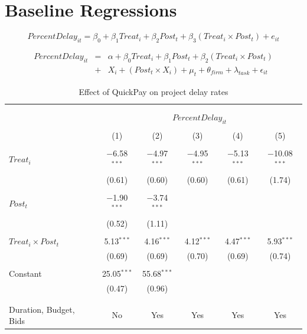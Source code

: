 \documentclass[
]{article}
\begin{document}
\hypertarget{baseline-regressions}{%
\section{Baseline Regressions}\label{baseline-regressions}}

\[ PercentDelay_{it} = \beta_0 + \beta_1 Treat_i + \beta_2 Post_t + \beta_3 (Treat_i \times Post_t) + e_{it}\]

\[ \begin{aligned} PercentDelay_{it} &=& \alpha+\beta_0 Treat_i + \beta_1 Post_t + \beta_2 (Treat_i \times Post_t)\\
&+&  X_i + (Post_t \times X_i) + \mu_t + \theta_{firm} + \lambda_{task}+ \epsilon_{it}
\end{aligned}\]

\begin{table}[H] \centering 
  \caption{Effect of QuickPay on project delay rates} 
  \label{} 
\small 
\begin{tabular}{@{\extracolsep{-2pt}}lccccc} 
\\[-1.8ex]\hline 
\hline \\[-1.8ex] 
\\[-1.8ex] & \multicolumn{5}{c}{$PercentDelay_{it}$} \\ 
\\[-1.8ex] & (1) & (2) & (3) & (4) & (5)\\ 
\hline \\[-1.8ex] 
 $Treat_i$ & $-$6.58$^{***}$ & $-$4.97$^{***}$ & $-$4.95$^{***}$ & $-$5.13$^{***}$ & $-$10.08$^{***}$ \\ 
  & (0.61) & (0.60) & (0.60) & (0.61) & (1.74) \\ 
  & & & & & \\ 
 $Post_t$ & $-$1.90$^{***}$ & $-$3.74$^{***}$ &  &  &  \\ 
  & (0.52) & (1.11) &  &  &  \\ 
  & & & & & \\ 
 $Treat_i \times Post_t$ & 5.13$^{***}$ & 4.16$^{***}$ & 4.12$^{***}$ & 4.47$^{***}$ & 5.93$^{***}$ \\ 
  & (0.69) & (0.69) & (0.70) & (0.69) & (0.74) \\ 
  & & & & & \\ 
 Constant & 25.05$^{***}$ & 55.68$^{***}$ &  &  &  \\ 
  & (0.47) & (0.96) &  &  &  \\ 
  & & & & & \\ 
\hline \\[-1.8ex] 
Duration, Budget, Bids & No & Yes & Yes & Yes & Yes \\ 

\end{tabular}
\end{table}
\end{document}
